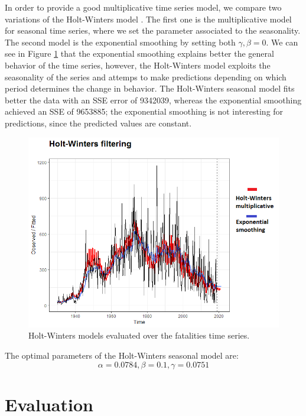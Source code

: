 \documentclass[12pt]{article}
\begin{document}
In order to provide a good multiplicative time series model, we compare two variations of the Holt-Winters model \cite{bib:forecastingprinciples}. The first one is the multiplicative model for seasonal time series, where we set the parameter associated to the seasonality. The second model is the exponential smoothing by setting both $\gamma,\beta = 0$. We can see in Figure \ref{fig:HoltWinters} that the exponential smoothing explains better the general behavior of the time series, however, the Holt-Winters model exploits the seasonality of the series and attemps to make predictions depending on which period determines the change in behavior. The Holt-Winters seasonal model fits better the data with an SSE error of 9342039, whereas the exponential smoothing achieved an SSE of 9653885; the exponential smoothing is not interesting for predictions, since the predicted values are constant.\\

\begin{figure}[H]
	\centering
	\includegraphics[width=1\linewidth]{holtWinters}
	\caption{Holt-Winters models evaluated over the fatalities time series.}
	\label{fig:HoltWinters}
\end{figure}

The optimal parameters of the Holt-Winters seasonal model are: $$\alpha=0.0784, \beta=0.1,\gamma=0.0751$$

\section{Evaluation}
\end{document}
